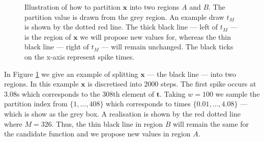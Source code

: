 \documentclass[oneside, 12 pt]{book}
\begin{document}
  \begin{figure}[t]
   \hrulefill
   \begin{center} 
    \end{center}     
    \caption{Illustration of how to partition $\mathbf{x}$ into two regions $A$ and $B$. The partition value is drawn from the grey region. An example draw $t_M$ is shown by the dotted red line. The thick black line --- left of $t_M$ --- is the region of $\mathbf{x}$  we will propose new values for, whereas the thin black line --- right of $t_M$ --- will remain unchanged. The black ticks on the x-axis represent spike times.}
    \label{fig:Proposal1}
    \hrulefill
    \end{figure}
    
 In Figure \ref{fig:Proposal1} we give an example of splitting $\mathbf{x}$ --- the black line --- into two regions. In this example $\mathbf{x}$ is discretised into $2000$ steps. The first spike occurs at $3.08$s which corresponds to the $308$th element of $\mathbf{t}$. Taking $w = 100$ we sample the partition index from $\{1, \dots, 408 \}$ which corresponds to times $\{0.01, \dots, 4.08\}$ --- which is show as the grey box. A realisation is shown by the red dotted line where $M =326$. Thus, the thin black line in region $B$ will remain the same for the candidate function and we propose new values in region $A$.
 
\end{document}
